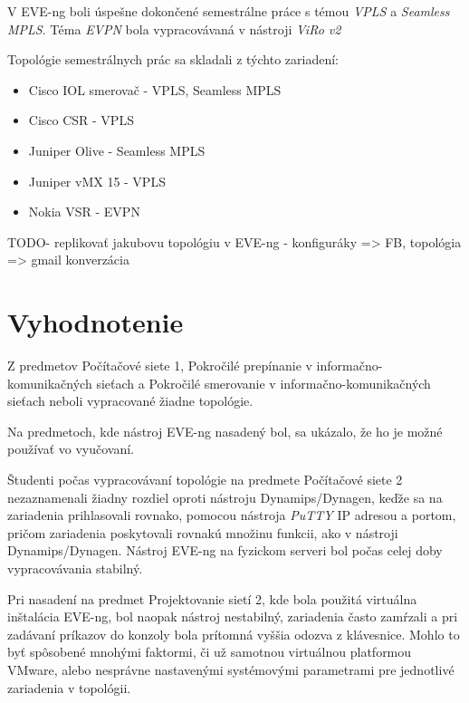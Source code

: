 V EVE-ng boli úspešne dokončené semestrálne práce s témou \emph{VPLS} a \emph{Seamless MPLS}. Téma \emph{EVPN} bola vypracovávaná v nástroji \emph{ViRo v2} 

Topológie semestrálnych prác sa skladali z týchto zariadení:

\begin{itemize}
    \item Cisco IOL smerovač - VPLS, Seamless MPLS
    \item Cisco CSR - VPLS
    \item Juniper Olive - Seamless MPLS
    \item Juniper vMX 15 - VPLS
    \item Nokia VSR - EVPN
\end{itemize}

{\huge TODO- replikovať jakubovu topológiu v EVE-ng - konfiguráky => FB, topológia => gmail konverzácia}


\section{Vyhodnotenie}

Z predmetov Počítačové siete 1, Pokročilé prepínanie v informačno-komunikačných sieťach a Pokročilé smerovanie v informačno-komunikačných sieťach neboli vypracované žiadne topológie.

Na predmetoch, kde nástroj EVE-ng nasadený bol, sa ukázalo, že ho je možné používať vo vyučovaní.

Študenti počas vypracovávaní topológie na predmete Počítačové siete 2 nezaznamenali žiadny rozdiel oproti nástroju Dynamips/Dynagen, keďže sa na zariadenia prihlasovali rovnako, pomocou nástroja \emph{PuTTY} IP adresou a portom, pričom zariadenia poskytovali rovnakú množinu funkcii, ako v nástroji Dynamips/Dynagen. Nástroj EVE-ng na fyzickom serveri bol počas celej doby vypracovávania stabilný.

Pri nasadení na predmet Projektovanie sietí 2, kde bola použitá virtuálna inštalácia EVE-ng, bol naopak nástroj nestabilný, zariadenia často zamŕzali a pri zadávaní príkazov do konzoly bola prítomná vyššia odozva z klávesnice. Mohlo to byť spôsobené mnohými faktormi, či už samotnou virtuálnou platformou VMware, alebo nesprávne nastavenými systémovými parametrami pre jednotlivé zariadenia v topológii.
